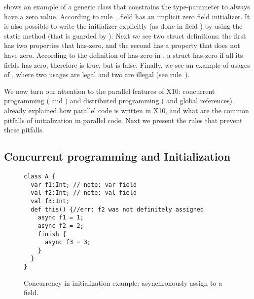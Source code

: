  shows an example of a generic class 
    that constrains the type-parameter  to always have a zero value.
According to rule~, field  has an implicit zero field initializer.
It is also possible to write the initializer explicitly (as done in field ) by using the static method 
    (that is guarded by ).
Next we see two struct definitions:
    the first has two properties that has-zero,
    and the second has a property that does not have zero.
According to the definition of has-zero in ,
    a struct has-zero if all its fields has-zero,
    therefore  is true, but
     is false.
Finally, we see an example of usages of ,
    where two usages are legal and two are illegal
    (see rule~).







We now turn our attention to the parallel features of X10:
    concurrent programming ( and )
    and distributed programming ( and global references).
 already explained how parallel code is written in X10,
    and what are the common pitfalls of initialization in parallel code.
Next we present the rules that prevent these pitfalls.

\subsection{Concurrent programming and Initialization}


\begin{figure}
\begin{lstlisting}
class A {
  var f1:Int; // note: var field
  val f2:Int; // note: val field
  val f3:Int;
  def this() {//err: f2 was not definitely assigned
    async f1 = 1;
    async f2 = 2;
    finish {
      async f3 = 3;
    }
  }
}
\end{lstlisting}
\caption{Concurrency in initialization example: asynchronously assign to a field.
    }
\label{Figure:Asynchronously-init}
\end{figure}


